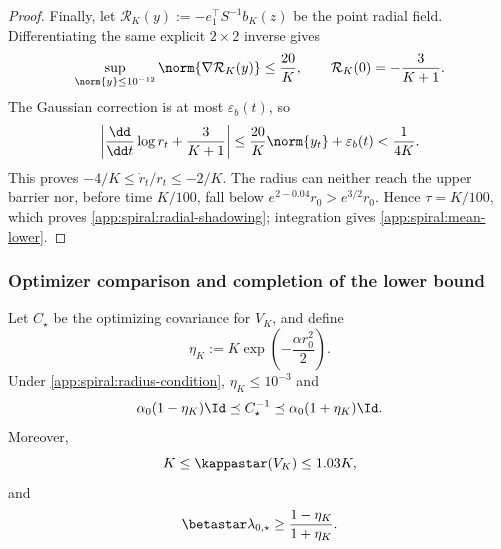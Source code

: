 \begin{proof}
Finally, let
\(\mathcal R_K(y):=-e_1^\top S^{-1}b_K(z)\) be the point radial field.
Differentiating the same explicit \(2\times2\) inverse gives
\[
 \sup_{\norm{y}\leq10^{-12}}\norm{\nabla\mathcal R_K(y)}
 \leq\frac{20}{K},
 \qquad
 \mathcal R_K(0)=-\frac3{K+1}.
\]
The Gaussian correction is at most \(\varepsilon_b(t)\), so
\[
 \left|\frac{\dd}{\dd t}\log r_t+\frac3{K+1}\right|
 \leq\frac{20}{K}\norm{y_t}+\varepsilon_b(t)
 <\frac1{4K}.
\]
This proves \(-4/K\leq\dot r_t/r_t\leq-2/K\).  The radius can neither
reach the upper barrier nor, before time \(K/100\), fall below
\(e^{2-0.04}r_0>e^{3/2}r_0\).  Hence \(\tau=K/100\), which proves
\eqref{app:spiral:radial-shadowing}; integration gives
\eqref{app:spiral:mean-lower}.
\end{proof}

\subsubsection{Optimizer comparison and completion of the lower bound}

\begin{lemma}
\label{app:spiral:optimizer-comparison}
Let \(C_\star\) be the optimizing covariance for \(V_K\), and define
\[
    \eta_K:=K\exp\left(-\frac{\alpha r_0^2}{2}\right).
\]
Under \eqref{app:spiral:radius-condition}, \(\eta_K\leq10^{-3}\) and
\begin{equation}
\label{app:spiral:optimizer-precision}
    \alpha_0(1-\eta_K)\Id
    \preceq C_\star^{-1}
    \preceq \alpha_0(1+\eta_K)\Id.
\end{equation}
Moreover,
\begin{equation}
\label{app:spiral:intrinsic-condition}
    K\leq\kappastar(V_K)\leq1.03K,
\end{equation}
and
\begin{equation}
\label{app:spiral:initial-product}
    \betastar\lambda_{0,\star}
    \geq\frac{1-\eta_K}{1+\eta_K}.
\end{equation}
\end{lemma}

